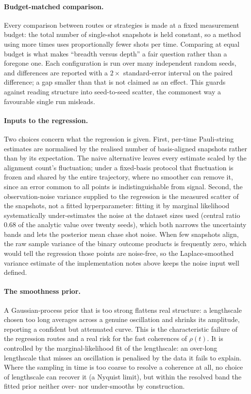 \documentclass[11pt]{article}
\begin{document}
\paragraph{Budget-matched comparison.} Every comparison between routes or strategies is made at a fixed
measurement budget: the total number of single-shot snapshots is held constant, so a method using more
times uses proportionally fewer shots per time. Comparing at equal budget is what makes ``breadth versus
depth'' a fair question rather than a foregone one. Each configuration is run over many independent random
seeds, and differences are reported with a $2\times$ standard-error interval on the paired difference; a
gap smaller than that is not claimed as an effect. This guards against reading structure into seed-to-seed
scatter, the commonest way a favourable single run misleads.

\paragraph{Inputs to the regression.} Two choices concern what the regression is given. First, per-time
Pauli-string estimates are normalised by the realised number of basis-aligned snapshots rather than by
its expectation. The naive alternative leaves every estimate scaled by the alignment count's fluctuation;
under a fixed-basis protocol that fluctuation is frozen and shared by the entire trajectory, where no
smoother can remove it, since an error common to all points is indistinguishable from signal. Second, the
observation-noise variance supplied to the regression is the measured scatter of the snapshots, not a
fitted hyperparameter: fitting it by marginal likelihood systematically under-estimates the noise at the
dataset sizes used (central ratio $0.68$ of the analytic value over twenty seeds), which both narrows the
uncertainty bands and lets the posterior mean chase shot noise. When few snapshots align, the raw sample
variance of the binary outcome products is frequently zero, which would tell the regression those points
are noise-free, so the Laplace-smoothed variance estimate of the implementation notes above keeps the noise input well defined.

\paragraph{The smoothness prior.} A Gaussian-process prior that is too strong flattens real structure: a
lengthscale chosen too long averages across a genuine oscillation and shrinks its amplitude, reporting a
confident but attenuated curve. This is the characteristic failure of the regression routes and a real
risk for the fast coherences of $\rho(t)$. It is controlled by the marginal-likelihood fit of the
lengthscale: an over-long lengthscale that misses an oscillation is penalised by the data it fails to
explain. Where the sampling in time is too coarse to resolve a coherence at all, no choice of lengthscale
can recover it (a Nyquist limit), but within the resolved band the fitted prior neither over- nor
under-smooths by construction.
\end{document}
